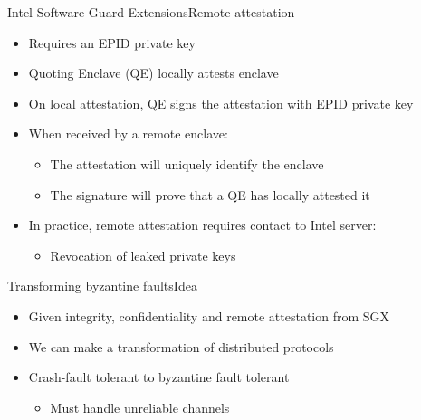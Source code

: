 \documentclass{beamer}
\begin{document}
\begin{frame}{Intel Software Guard Extensions}{Remote attestation}
	\begin{itemize}

		\vfill

		\item Requires an EPID private key

		\vfill

		\item Quoting Enclave (QE) locally attests enclave

		\vfill

		\item On local attestation, QE signs the attestation with EPID private key

		\vfill

		\item When received by a remote enclave:
    \begin{itemize}
       \item The attestation will uniquely identify the enclave
       \item The signature will prove that a QE has locally attested it
     \end{itemize}

		\vfill

		\item In practice, remote attestation requires contact to Intel server:%
    \begin{itemize}
       \item Revocation of leaked private keys
     \end{itemize} 
	\end{itemize}
\end{frame}

\begin{frame}{Transforming byzantine faults}{Idea} %
  \begin{itemize}
  	\item Given integrity, confidentiality and remote attestation from SGX

  	\vfill

  	\item We can make a transformation of distributed protocols

  	\vfill

  	\item Crash-fault tolerant to byzantine fault tolerant
  	\begin{itemize}
  		\item Must handle unreliable channels
  	\end{itemize}
  \end{itemize}
\end{frame}
\end{document}
